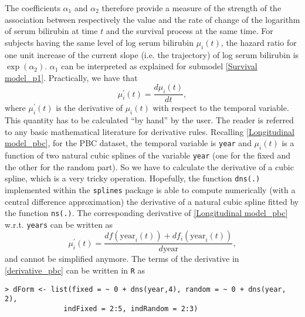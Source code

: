 \documentclass[12pt]{article}
\begin{document}
The coefficients $\alpha_1$ and $\alpha_2$ therefore provide a measure of the strength of the association between respectively the value and the rate of change of the logarithm of serum bilirubin at time $t$ and the survival process at the same time. For subjects having the same level of log serum bilirubin $\mu_i(t)$, the hazard ratio for one unit increase of the current slope (i.e. the trajectory) of log serum bilirubin is $\exp (\alpha_2)$. $\alpha_1$ can be interpreted as explained for submodel \eqref{Survival model_p1}.
Practically, we have that
\begin{equation}
\mu_i^{'}(t)=\frac{d\mu_i(t)}{dt},
\end{equation}
where $\mu_i^{'}(t)$ is the derivative of $\mu_i(t)$ with respect to the temporal variable. This quantity has to be calculated ``by hand'' by the user. The reader is referred to any basic mathematical literature for derivative rules. Recalling \eqref{Longitudinal model_pbc}, for the PBC dataset, the temporal variable is \texttt{year} and $\mu_i(t)$ is a function of two natural cubic splines of the variable \texttt{year} (one for the fixed and the other for the random part). So we have to calculate the derivative of a cubic spline, which is a very tricky operation. Hopefully, the function \texttt{dns(.)} implemented within the \texttt{splines} package is able to compute numerically (with a central difference approximation) the derivative of a natural cubic spline fitted by the function \texttt{ns(.)}.
The corresponding derivative of \eqref{Longitudinal model_pbc} w.r.t. \texttt{years} can be written as
\begin{equation}
\mu_i^{'}(t)=\frac{df(\text{year}_i(t))+df_i(\text{year}_i(t))}{d\text{year}},
\label{derivative_pbc}
\end{equation}
and cannot be simplified anymore.
The terms of the derivative in \eqref{derivative_pbc} can be written in \texttt{R} as
\begin{verbatim}
> dForm <- list(fixed = ~ 0 + dns(year,4), random = ~ 0 + dns(year, 2),
              indFixed = 2:5, indRandom = 2:3)
\end{verbatim}
\end{document}
